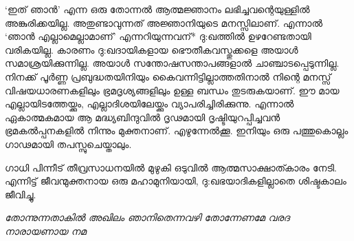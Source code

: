 ‘ഇത് ഞാന്‍’ എന്ന ഒരു തോന്നല്‍ ആത്മജ്ഞാനം ലഭിച്ചവന്റെയുള്ളില്‍ അങ്കുരിക്കയില്ല. അതുണ്ടാവുന്നത് അജ്ഞാനിയുടെ മനസ്സിലാണ്. എന്നാല്‍ ‘ഞാന്‍ എല്ലാമെല്ലാമാണ്’ എന്നറിയുന്നവന്* ദു:ഖത്തില്‍ ഉഴറേണ്ടതായി വരികയില്ല. കാരണം ദു:ഖദായികളായ ഭൌതീകവസ്തുക്കളെ അയാള്‍ സമാശ്രയിക്കുന്നില്ല. അയാള്‍ സന്തോഷസന്താപങ്ങളാല്‍ ചാഞ്ചാടപ്പെടുന്നില്ല. നിനക്ക് പൂര്‍ണ്ണ പ്രബുദ്ധതയിനിയും കൈവന്നിട്ടില്ലാത്തതിനാല്‍ നിന്റെ മനസ്സ് വിഷയധാരണകളിലും ഭ്രമദൃശ്യങ്ങളിലും ഉള്ള ബന്ധം തുടരുകയാണ്. ഈ മായ എല്ലായിടത്തേയ്ക്കും, എല്ലാദിശയിലേയ്ക്കും വ്യാപരിച്ചിരിക്കുന്നു. എന്നാല്‍ ഏകാത്മകമായ ആ മദ്ധ്യബിന്ദുവില്‍ ദൃഢമായി ദൃഷ്ടിയുറപ്പിച്ചവന്‍ ഭ്രമകല്‍പ്പനകളില്‍ നിന്നും മുക്തനാണ്. എഴുന്നേല്‍ക്കൂ. ഇനിയും ഒരു പത്തുകൊല്ലം ഗാഢമായി തപസ്സുചെയ്താലും.

ഗാധി പിന്നീട് തീവ്രസാധനയില്‍ മുഴുകി ഒടുവില്‍ ആത്മസാക്ഷാത്കാരം നേടി. എന്നിട്ട് ജീവന്മുക്തനായ ഒരു മഹാമുനിയായി, ദു:ഖഭയാദികളില്ലാതെ  ശിഷ്ടകാലം ജീവിച്ചു. 
   
\textit{തോന്നുന്നതാകില്‍ അഖിലം ഞാനിതെന്നവഴി തോന്നേണമേ വരദ നാരായണായ നമ}

